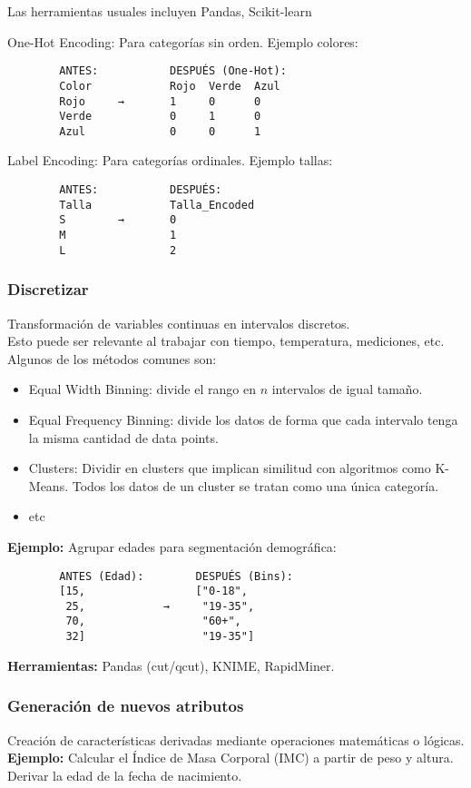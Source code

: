 \documentclass[12pt]{book}
\begin{document}
Las herramientas usuales incluyen Pandas, Scikit-learn

One-Hot Encoding: Para categorías sin orden. Ejemplo colores:
    \begin{verbatim}
        ANTES:           DESPUÉS (One-Hot):
        Color            Rojo  Verde  Azul
        Rojo     →       1     0      0
        Verde            0     1      0
        Azul             0     0      1
    \end{verbatim}
Label Encoding: Para categorías ordinales. Ejemplo tallas:
    \begin{verbatim}
        ANTES:           DESPUÉS:
        Talla            Talla_Encoded
        S        →       0
        M                1
        L                2
    \end{verbatim}

\subsubsection{Discretizar}
Transformación de variables continuas en intervalos discretos.\\
Esto puede ser relevante al trabajar con tiempo, temperatura, mediciones, etc.
Algunos de los métodos comunes son:
\begin{itemize}
    \item Equal Width Binning: divide el rango en $n$ intervalos de igual tamaño.
    \item Equal Frequency Binning: divide los datos de forma que cada intervalo tenga la misma cantidad de data points.
    \item Clusters: Dividir en clusters que implican similitud con algoritmos como K-Means. Todos los datos de un cluster se tratan como una única categoría.
    \item etc
\end{itemize}

\textbf{Ejemplo:} 
Agrupar edades para segmentación demográfica:
    \begin{verbatim}
        ANTES (Edad):        DESPUÉS (Bins):
        [15,                 ["0-18",
         25,            →     "19-35",
         70,                  "60+",
         32]                  "19-35"]
    \end{verbatim}

\textbf{Herramientas:} Pandas (cut/qcut), KNIME, RapidMiner.

\subsubsection{Generación de nuevos atributos}
Creación de características derivadas mediante operaciones matemáticas o lógicas. \\
\textbf{Ejemplo:} Calcular el Índice de Masa Corporal (IMC) a partir de peso y altura.
Derivar la edad de la fecha de nacimiento.\\
\end{document}
